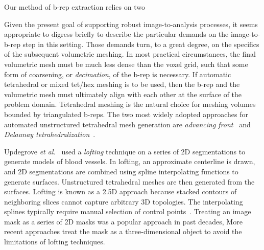 Our method of b-rep extraction relies on two 



Given the present goal of supporting robust image-to-analysis processes, it 
seems appropriate to digress briefly to describe the particular demands 
on the image-to-b-rep step in this setting.  Those 
demands turn, to a great degree, on the specifics of the subsequent
volumetric meshing.  In most practical circumstances, the final volumetric mesh
must be much less dense than the voxel grid, such that some form of coarsening, or {\em decimation}, of the b-rep is necessary.   If automatic tetrahedral or mixed tet/hex meshing is to be used, then the b-rep and the volumetric mesh must ultimately
align with each other at the surface of the problem domain.  
Tetrahedral meshing is the natural choice for meshing volumes bounded by triangulated b-reps.  The two most widely adopted approaches for automated unstructured tetrahedral mesh generation are \textit{advancing front}~\cite{jin_1993, lohner_1988} and \textit{Delaunay tetrahedralization}~\cite{lohner_1997}.


 Updegrove \textit{et al.}~\cite{updegrove_2016} used a \textit{lofting} technique on a series of 2D segmentations to generate models of blood vessels. In lofting, an approximate centerline is drawn, and 2D segmentations are combined using spline interpolating functions to generate surfaces. Unstructured tetrahedral meshes are then generated from the surfaces. Lofting is known as a 2.5D approach because stacked contours of neighboring slices cannot capture arbitrary 3D topologies. The interpolating splines typically require manual selection of control points~\cite{young_2008}. Treating an image mask as a series of 2D masks was a popular approach in past decades, More recent approaches treat the mask as a three-dimensional object to avoid the limitations of lofting techniques.
 

